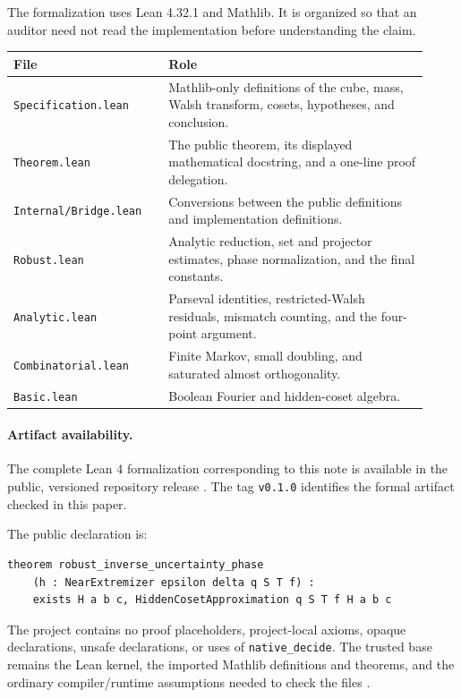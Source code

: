 \documentclass[11pt]{article}
\theoremstyle{remark}
\newcommand{\1}{\mathbf 1}
\begin{document}
The formalization uses Lean 4.32.1 and Mathlib. It is organized so that an
auditor need not read the implementation before understanding the claim.
\begin{center}
\begin{tabular}{p{0.34\linewidth}p{0.58\linewidth}}
\hline
File & Role\\
\hline
\texttt{Specification.lean} &
Mathlib-only definitions of the cube, mass, Walsh transform, cosets,
hypotheses, and conclusion.\\
\texttt{Theorem.lean} &
The public theorem, its displayed mathematical docstring, and a one-line
proof delegation.\\
\texttt{Internal/Bridge.lean} &
Conversions between the public definitions and implementation definitions.\\
\texttt{Robust.lean} &
Analytic reduction, set and projector estimates, phase normalization, and
the final constants.\\
\texttt{Analytic.lean} &
Parseval identities, restricted-Walsh residuals, mismatch counting, and the
four-point argument.\\
\texttt{Combinatorial.lean} &
Finite Markov, small doubling, and saturated almost orthogonality.\\
\texttt{Basic.lean} &
Boolean Fourier and hidden-coset algebra.\\
\hline
\end{tabular}
\end{center}

\paragraph{Artifact availability.}
The complete Lean 4 formalization corresponding to this note is available in
the public, versioned repository release
\cite{GeorgiouLeanArtifact2026}. The tag \texttt{v0.1.0} identifies the
formal artifact checked in this paper.

The public declaration is:
\begin{verbatim}
theorem robust_inverse_uncertainty_phase
    (h : NearExtremizer epsilon delta q S T f) :
    exists H a b c, HiddenCosetApproximation q S T f H a b c
\end{verbatim}
The project contains no proof placeholders, project-local axioms, opaque
declarations, unsafe declarations, or uses of \texttt{native\_decide}. The
trusted base remains the Lean kernel, the imported Mathlib definitions and
theorems, and the ordinary compiler/runtime assumptions needed to check the
files \cite{deMouraUllrich2021,Mathlib2020}.
\end{document}
